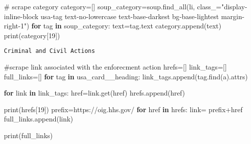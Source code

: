 \documentclass[
  letterpaper,
  DIV=11,
  numbers=noendperiod]{scrartcl}
\newenvironment{Shaded}{\begin{snugshade}}{\end{snugshade}}
\newcommand{\BuiltInTok}[1]{\textcolor[rgb]{0.00,0.23,0.31}{#1}}
\newcommand{\CommentTok}[1]{\textcolor[rgb]{0.37,0.37,0.37}{#1}}
\newcommand{\ControlFlowTok}[1]{\textcolor[rgb]{0.00,0.23,0.31}{\textbf{#1}}}
\newcommand{\DecValTok}[1]{\textcolor[rgb]{0.68,0.00,0.00}{#1}}
\newcommand{\KeywordTok}[1]{\textcolor[rgb]{0.00,0.23,0.31}{\textbf{#1}}}
\newcommand{\NormalTok}[1]{\textcolor[rgb]{0.00,0.23,0.31}{#1}}
\newcommand{\OperatorTok}[1]{\textcolor[rgb]{0.37,0.37,0.37}{#1}}
\newcommand{\StringTok}[1]{\textcolor[rgb]{0.13,0.47,0.30}{#1}}
\begin{document}
\begin{Shaded}
\begin{Highlighting}[]
\CommentTok{\# scrape category}
\NormalTok{category}\OperatorTok{=}\NormalTok{[]}
\NormalTok{soup\_category}\OperatorTok{=}\NormalTok{soup.find\_all(}\StringTok{\textquotesingle{}li\textquotesingle{}}\NormalTok{, class\_}\OperatorTok{=}\StringTok{"display{-}inline{-}block usa{-}tag text{-}no{-}lowercase text{-}base{-}darkest bg{-}base{-}lightest margin{-}right{-}1"}\NormalTok{)}
\ControlFlowTok{for}\NormalTok{ tag }\KeywordTok{in}\NormalTok{ soup\_category:}
\NormalTok{  text}\OperatorTok{=}\NormalTok{tag.text}
\NormalTok{  category.append(text)}
\BuiltInTok{print}\NormalTok{(category[}\DecValTok{19}\NormalTok{])}
\end{Highlighting}
\end{Shaded}

\begin{verbatim}
Criminal and Civil Actions
\end{verbatim}

\begin{Shaded}
\begin{Highlighting}[]
\CommentTok{\#scrape link associated with the enforecment action }
\NormalTok{hrefs}\OperatorTok{=}\NormalTok{[]}
\NormalTok{link\_tags}\OperatorTok{=}\NormalTok{[]}
\NormalTok{full\_links}\OperatorTok{=}\NormalTok{[]}
\ControlFlowTok{for}\NormalTok{ tag }\KeywordTok{in}\NormalTok{ usa\_card\_\_heading:}
\NormalTok{  link\_tags.append(tag.find(}\StringTok{\textquotesingle{}a\textquotesingle{}}\NormalTok{).attrs)}

\ControlFlowTok{for}\NormalTok{ link }\KeywordTok{in}\NormalTok{ link\_tags:}
\NormalTok{  href}\OperatorTok{=}\NormalTok{link.get(}\StringTok{\textquotesingle{}href\textquotesingle{}}\NormalTok{)}
\NormalTok{  hrefs.append(href)}

\BuiltInTok{print}\NormalTok{(hrefs[}\DecValTok{19}\NormalTok{])}
\NormalTok{prefix}\OperatorTok{=}\StringTok{\textquotesingle{}https://oig.hhs.gov/\textquotesingle{}}
\ControlFlowTok{for}\NormalTok{ href }\KeywordTok{in}\NormalTok{ hrefs:}
\NormalTok{  link}\OperatorTok{=}\NormalTok{ prefix}\OperatorTok{+}\NormalTok{href}
\NormalTok{  full\_links.append(link)}

\BuiltInTok{print}\NormalTok{(full\_links)}
\end{Highlighting}
\end{Shaded}
\end{document}
